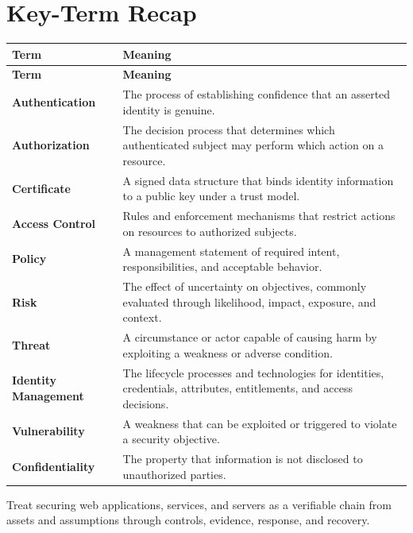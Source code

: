 \documentclass[11pt]{article}
\begin{document}
\section*{Key-Term Recap}
\begin{longtable}{>{\RaggedRight\arraybackslash}p{}>{\RaggedRight\arraybackslash}p{}}
\toprule\rowcolor{Navy}\color{white}\textbf{Term} & \color{white}\textbf{Meaning}\\\midrule
\endfirsthead
\toprule\rowcolor{Navy}\color{white}\textbf{Term} & \color{white}\textbf{Meaning}\\\midrule
\endhead
\textbf{Authentication} & The process of establishing confidence that an asserted identity is genuine. \\\midrule
\textbf{Authorization} & The decision process that determines which authenticated subject may perform which action on a resource. \\\midrule
\textbf{Certificate} & A signed data structure that binds identity information to a public key under a trust model. \\\midrule
\textbf{Access Control} & Rules and enforcement mechanisms that restrict actions on resources to authorized subjects. \\\midrule
\textbf{Policy} & A management statement of required intent, responsibilities, and acceptable behavior. \\\midrule
\textbf{Risk} & The effect of uncertainty on objectives, commonly evaluated through likelihood, impact, exposure, and context. \\\midrule
\textbf{Threat} & A circumstance or actor capable of causing harm by exploiting a weakness or adverse condition. \\\midrule
\textbf{Identity Management} & The lifecycle processes and technologies for identities, credentials, attributes, entitlements, and access decisions. \\\midrule
\textbf{Vulnerability} & A weakness that can be exploited or triggered to violate a security objective. \\\midrule
\textbf{Confidentiality} & The property that information is not disclosed to unauthorized parties. \\\midrule
\bottomrule
\end{longtable}
\begin{takeawaybox}
Treat securing web applications, services, and servers as a verifiable chain from assets and assumptions through controls, evidence, response, and recovery.
\end{takeawaybox}
\end{document}
